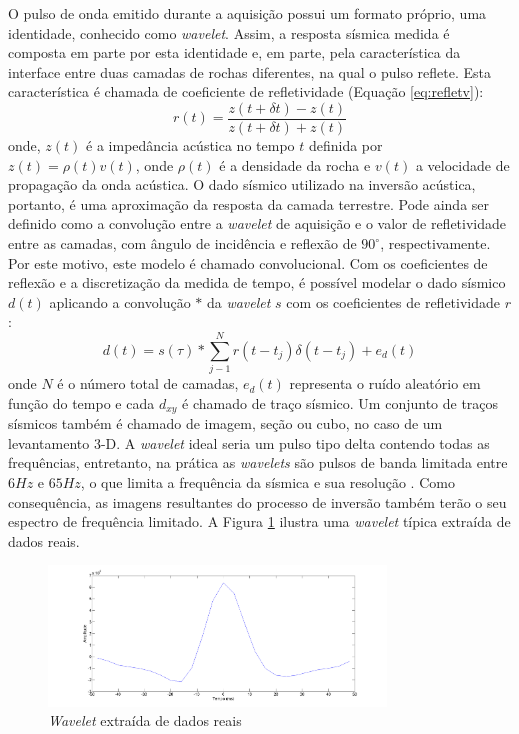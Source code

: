 O pulso de onda emitido durante a aquisição possui um formato próprio, uma identidade, 
conhecido como \textit{wavelet}. Assim, a resposta sísmica medida
é composta em parte por esta identidade e, em parte, pela característica da interface
entre duas camadas de rochas diferentes, na qual o pulso reflete.
Esta característica é chamada de coeficiente de refletividade (Equação \ref{eq:refletv}):
\begin{equation}
r(t) = \frac{z(t+\delta t)-z(t)}{z(t+\delta t)+z(t)}
\label{eq:refletv}
\end{equation}
onde, $z(t)$ é a impedância acústica no tempo $t$ definida por
$z(t)=\rho(t)v(t)$, onde $\rho(t)$ é a densidade da rocha e $v(t)$ a
velocidade de propagação da onda acústica.
O dado sísmico utilizado na inversão acústica, portanto,
é uma aproximação da resposta da camada terrestre. Pode ainda ser definido como
a convolução entre a \textit{wavelet} de aquisição e o valor de refletividade entre as
camadas, com ângulo de incidência e reflexão de $90^\circ$,
respectivamente. Por este motivo, este modelo é chamado convolucional.
Com os coeficientes de reflexão e a discretização da medida de tempo, é possível
modelar o dado sísmico $d(t)$ aplicando a convolução $*$
da \textit{wavelet} $s$ com os coeficientes de refletividade $r$:
\begin{equation}
d(t) = s(\tau) * \sum_{j-1}^{N}{r(t- t_j) \delta(t - t_j) + e_d(t)}
\end{equation}
onde $N$ é o número total de camadas, $e_d(t)$ representa o ruído aleatório em função do tempo
e cada $d_{xy}$ é chamado de traço sísmico. Um conjunto de traços
sísmicos também é chamado de imagem, seção ou cubo, no caso de um
levantamento 3-D. A \textit{wavelet} ideal seria um pulso tipo delta contendo
todas as frequências, entretanto, na prática as
\textit{wavelets} são pulsos de banda limitada entre $6Hz$ e $65Hz$, o que
limita a frequência da sísmica e sua resolução \citep[p. 11]{sen_livro}.
Como consequência, as imagens resultantes do processo de inversão também terão
o seu espectro de frequência limitado. A Figura \ref{fig:wavelet} ilustra uma
\textit{wavelet} típica extraída de dados reais.
\begin{figure}[htp]
\begin{center}
  \includegraphics[width=0.8\textwidth]{fig/wavelet}
  \caption{\textit{Wavelet} extraída de dados reais}
  \label{fig:wavelet}
\end{center}
\end{figure}

